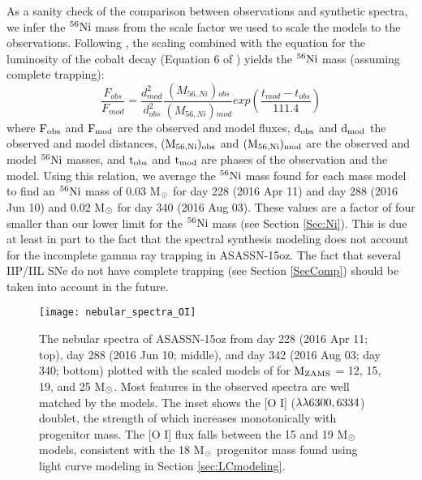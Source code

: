\documentclass[a4paper,fleqn,usenatbib]{mnras}
\newcommand{\msun}{M$\rm{_{\odot}}$ }
\begin{document}
As a sanity check of the comparison between observations and synthetic spectra, we infer the $\rm{{}^{56}Ni}$ mass from the scale factor we used to scale the models to the observations.
Following \citet{2018jerkstrand}, the scaling combined with the equation for the luminosity of the cobalt decay (Equation 6 of \citealt{2012jerkstrand}) yields the $\rm{{}^{56}Ni}$ mass (assuming complete trapping): 
\begin{equation}
\frac{F_{obs}}{F_{mod}} = \frac{d_{mod}^{2}}{d_{obs}^{2}}\frac{(M_{56,Ni}){}_{obs}}{(M_{56, Ni}){}_{mod}}exp\left(\frac{t_{mod} - t_{obs}}{111.4}\right)
\end{equation}
where $\rm{F_{obs}}$ and $\rm{F_{mod}}$ are the observed and model fluxes, $\rm{d_{obs}}$ and $\rm{d_{mod}}$ the observed and model distances, $\rm{(M_{56, Ni}){}_{obs}}$ and $\rm{(M_{56, Ni}){}_{mod}}$ are the observed and model $\rm{{}^{56}Ni}$ masses, and $\rm{t_{obs}}$ and $\rm{t_{mod}}$ are phases of the observation and the model.
Using this relation, we average the $\rm{{}^{56}Ni}$ mass found for each mass model to find an $\rm{{}^{56}Ni}$ mass of 0.03 \msun for day 228 (2016 Apr 11) and day 288 (2016 Jun 10) and 0.02 \msun for day 340 (2016 Aug 03).
These values are a factor of four smaller than our lower limit for the $\rm{{}^{56}Ni}$ mass (see Section \ref{Sec:Ni}).
This is due at least in part to the fact that the spectral synthesis modeling does not account for the incomplete gamma ray trapping in ASASSN-15oz.
The fact that several IIP/IIL SNe do not have complete trapping (see Section \ref{SecComp}) should be taken into account in the future.
\begin{figure}
\begin{center}
\texttt{[image: nebular\_spectra\_OI]} %
\caption{The nebular spectra of ASASSN-15oz from day 228 (2016 Apr 11; top), day 288 (2016 Jun 10; middle), and day 342 (2016 Aug 03; day 340; bottom) plotted with the scaled models of \citet{2014jerkstrand} for $\rm{M_{ZAMS}}$ = 12, 15, 19, and 25 M$\rm{_{\odot}}$. 
Most features in the observed spectra are well matched by the models. 
The inset shows the [O I] ($\rm{\lambda\lambda6300, 6334}$) doublet, the strength of which increases monotonically with progenitor mass. 
The [O I] flux falls between the 15 and 19 M$\rm{_{\odot}}$ models, consistent with the 18 M$\rm{_{\odot}}$ progenitor mass found using light curve modeling in Section \ref{sec:LCmodeling}.}
\label{fig:neb}
\end{center}
\end{figure}
\end{document}
